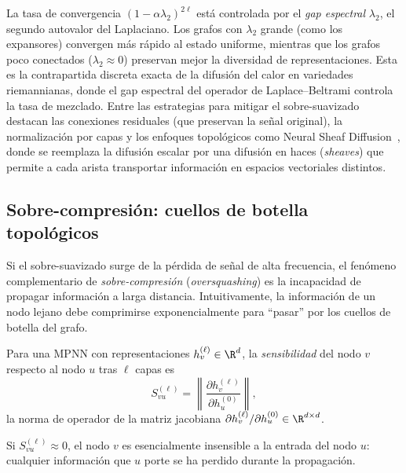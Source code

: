 \begin{remark}
\label{rem:priors:oversmoothing}
La tasa de convergencia $(1 - \alpha \lambda_2)^{2\ell}$ est\'a controlada por el
\emph{gap espectral} $\lambda_2$, el segundo autovalor del Laplaciano. Los grafos
con $\lambda_2$ grande (como los expansores) convergen m\'as r\'apido al estado
uniforme, mientras que los grafos poco conectados ($\lambda_2 \approx 0$)
preservan mejor la diversidad de representaciones. Esta es la contrapartida
discreta exacta de la difusi\'on del calor en variedades riemannianas, donde el
gap espectral del operador de Laplace--Beltrami controla la tasa de mezclado.
Entre las estrategias para mitigar el sobre-suavizado destacan las conexiones
residuales (que preservan la se\~nal original), la normalizaci\'on por capas y los
enfoques topol\'ogicos como Neural Sheaf Diffusion~\citep{bodnar2022neural}, donde
se reemplaza la difusi\'on escalar por una difusi\'on en haces (\emph{sheaves})
que permite a cada arista transportar informaci\'on en espacios vectoriales
distintos.
\end{remark}

\subsection{Sobre-compresi\'on: cuellos de botella topol\'ogicos}
\label{sec:priors:oversquashing}

Si el sobre-suavizado surge de la p\'erdida de se\~nal de alta frecuencia, el
fen\'omeno complementario de \emph{sobre-compresi\'on} (\emph{oversquashing}) es
la incapacidad de propagar informaci\'on a larga distancia. Intuitivamente, la
informaci\'on de un nodo lejano debe comprimirse exponencialmente para ``pasar''
por los cuellos de botella del grafo.

\begin{definition}
\label{def:priors:sensitivity}
Para una MPNN con representaciones $h_v^{(\ell)} \in \R^d$, la
\emph{sensibilidad} del nodo $v$ respecto al nodo $u$ tras $\ell$ capas es
\[
  S_{vu}^{(\ell)} = \left\| \frac{\partial h_v^{(\ell)}}{\partial h_u^{(0)}} \right\|,
\]
la norma de operador de la matriz jacobiana
$\partial h_v^{(\ell)} / \partial h_u^{(0)} \in \R^{d \times d}$.
\end{definition}

Si $S_{vu}^{(\ell)} \approx 0$, el nodo $v$ es esencialmente insensible a la
entrada del nodo $u$: cualquier informaci\'on que $u$ porte se ha perdido durante
la propagaci\'on.

